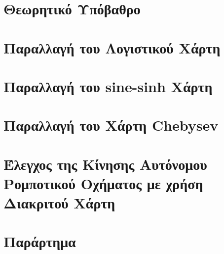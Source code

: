 \documentclass[a4paper,11pt,twoside]{report}
\renewcommand{\headrulewidth}{0.2pt}
\begin{document}
	
	
	\tableofcontents
	\lstlistoflistings
	
	
	
	\newpage
	\null
	\thispagestyle{empty}
	\newpage
	
	\chapter{Θεωρητικό Υπόβαθρο}
	
	
	\chapter{Παραλλαγή του Λογιστικού Χάρτη}
	\label{chap:kef2}
	
	\null
	\thispagestyle{empty}
	\newpage
	\chapter{Παραλλαγή του sine-sinh Χάρτη}
	
	\null
	\thispagestyle{empty}
	\newpage
	\chapter{Παραλλαγή του Χάρτη Chebysev}
	
	\null
	\thispagestyle{empty}
	\newpage
	\chapter{Έλεγχος της Κίνησης Αυτόνομου Ρομποτικού Οχήματος με χρήση Διακριτού Χάρτη}
	

	
	
	\null
	\thispagestyle{empty}
	\newpage

	\chapter*{Παράρτημα}
	\pagestyle{fancy}
	\fancyhf{}
	\fancyfoot[LE,RO]{\thepage}
	\renewcommand{\headrulewidth}{0.2pt}
	
	
	\listoffigures
	\listoftables
	
	
\end{document}
